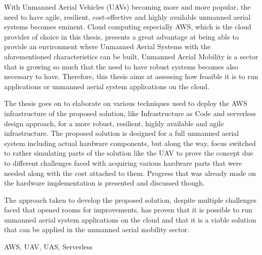 
\abstract

With Unmanned Aerial Vehicles (UAVs) becoming more and more popular, the need to have agile, resilient, cost-effective and highly available unmanned aerial systems becomes eminent. Cloud computing especially AWS, which is the cloud provider of choice in this thesis, presents a great advantage at being able to provide an environment where Unmanned Aerial Systems with the aforementioned characteristics can be built. Unmanned Aerial Mobility is a sector that is growing so much that the need to have robust systems becomes also necessary to have. Therefore, this thesis aims at assessing how feasible it is to run applications or unmanned aerial system applications on the cloud.

The thesis goes on to elaborate on various techniques used to deploy the AWS infrastructure of the proposed solution, like Infrastructure as Code and serverless design approach, for a more robust, resilient, highly available and agile infrastructure. The proposed solution is designed for a full unmanned aerial system including actual hardware components, but along the way, focus switched to rather simulating parts of the solution like the UAV to prove the concept due to different challenges faced with acquiring various hardware parts that were needed along with the cost attached to them. Progress that was already made on the hardware implementation is presented and discussed though.

The approach taken to develop the proposed solution, despite multiple challenges faced that opened rooms for improvements, has proven that it is possible to run unmanned aerial system applications on the cloud and that it is a viable solution that can be applied in the unmanned aerial mobility sector.

\keywords AWS, UAV, UAS, Serverless